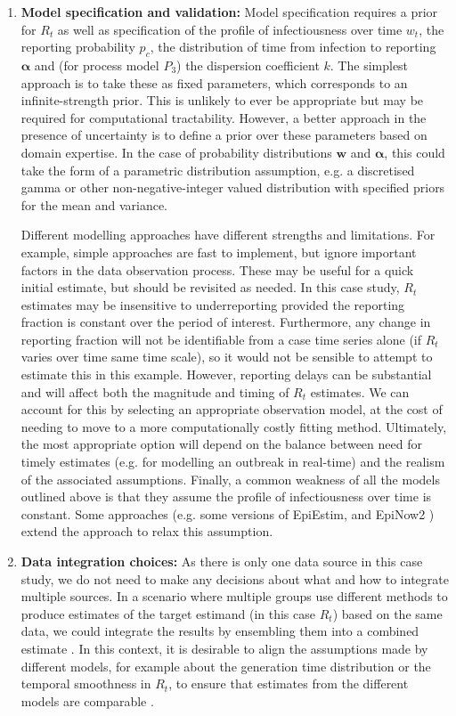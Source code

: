 \documentclass{article}
\begin{document}
\begin{enumerate}
\item \textbf{Model specification and validation:} Model specification requires a prior for $R_t$ as well as specification of the profile of infectiousness over time $w_t$, the reporting probability $p_c$, the distribution of time from infection to reporting $\boldsymbol{\alpha}$ and (for process model $P_3$) the dispersion coefficient $k$. The simplest approach is to take these as fixed parameters, which corresponds to an infinite-strength prior. This is unlikely to ever be appropriate but may be required for computational tractability. However, a better approach in the presence of uncertainty is to define a prior over these parameters based on domain expertise. In the case of probability distributions $\boldsymbol{w}$ and $\boldsymbol{\alpha}$, this could take the form of a parametric distribution assumption, e.g. a discretised gamma \citep{charniga2024best,park2024estimating} or other non-negative-integer valued distribution with specified priors for the mean and variance. 

Different modelling approaches have different strengths and limitations. For example, simple approaches are fast to implement, but ignore important factors in the data observation process. These may be useful for a quick initial estimate, but should be revisited as needed. In this case study, $R_t$ estimates may be insensitive to underreporting provided the reporting fraction is constant over the period of interest. Furthermore, any change in reporting fraction will not be identifiable from a case time series alone (if $R_t$ varies over time same time scale), so it would not be sensible to attempt to estimate this in this example. However, reporting delays can be substantial and will affect both the magnitude and timing of $R_t$ estimates. We can account for this by selecting an appropriate observation model, at the cost of needing to move to a more computationally costly fitting method. Ultimately, the most appropriate option will depend on the balance between need for timely estimates (e.g. for modelling an outbreak in real-time) and the realism of the associated assumptions. 
Finally, a common weakness of all the models outlined above is that they assume the profile of infectiousness over time is constant. Some approaches (e.g. some versions of EpiEstim, and EpiNow2 \citep{abbott2020estimating}) extend the approach to relax this assumption.
 
\item \textbf{Data integration choices:} As there is only one data source in this case study, we do not need to make any decisions about what and how to integrate multiple sources. In a scenario where multiple groups use different methods to produce estimates of the target estimand (in this case $R_t$) based on the same data, we could integrate the results by ensembling them into a combined estimate \citep{maishman2022statistical,manley2024combining}. In this context, it is desirable to align the assumptions made by different models, for example about the generation time distribution or the temporal smoothness in $R_t$, to ensure that estimates from the different models are comparable \citep{brockhaus2023why}.

 \end{enumerate}
\end{document}
